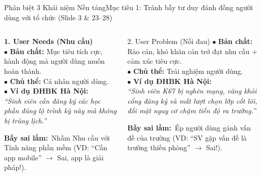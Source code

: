 \documentclass[aspectratio=169, 10pt]{beamer}
\begin{document}
\begin{frame}[t]{Phân biệt 3 Khái niệm Nền tảng}{Mục tiêu 1: Tránh bẫy tư duy đánh đồng người dùng với tổ chức (Slide 3 \& 23--28)}
  \vspace{-0.15cm}
  \begin{columns}[T]
      \begin{neutralBox}
        \scriptsize
        \textbf{\color{PrimaryBlue}1. User Needs (Nhu cầu)}\\[0.06cm]
        $\bullet$ \textbf{Bản chất:} Mục tiêu tích cực, hành động mà người dùng muốn hoàn thành.\\
        $\bullet$ \textbf{Chủ thể:} Cá nhân người dùng.\\
        $\bullet$ \textbf{Ví dụ ĐHBK Hà Nội:}\\\textit{``Sinh viên cần đăng ký các học phần đúng lộ trình kỳ này mà không bị trùng lịch.''}\\[0.1cm]
        \begin{tcolorbox}[colback=red!5!white, colframe=HustRed!50, arc=1mm, boxrule=0.4pt, left=1mm, right=1mm, top=1mm, bottom=1mm]
          \tiny\textbf{Bẫy sai lầm:}\ Nhầm Nhu cầu với Tính năng phần mềm (VD: ``Cần app mobile'' $\to$ Sai, app là giải pháp!).
        \end{tcolorbox}
      \end{neutralBox}

      \begin{alertCard}{2. User Problem (Nỗi đau)}
        \scriptsize
        $\bullet$ \textbf{Bản chất:} Rào cản, khó khăn cản trở đạt nhu cầu + cảm xúc tiêu cực.\\
        $\bullet$ \textbf{Chủ thể:} Trải nghiệm người dùng.\\
        $\bullet$ \textbf{Ví dụ ĐHBK Hà Nội:}\\\textit{``Sinh viên K67 bị nghẽn mạng, văng khỏi cổng đăng ký và mất lượt chọn lớp cốt lõi, đối mặt nguy cơ chậm tiến độ ra trường.''}\\[0.05cm]
        \begin{tcolorbox}[colback=white, colframe=HustRed!50, arc=1mm, boxrule=0.4pt, left=1mm, right=1mm, top=1mm, bottom=1mm]
          \tiny\textbf{Bẫy sai lầm:}\ Ép người dùng gánh vấn đề của trường (VD: ``SV gặp vấn đề là trường thiếu phòng'' $\to$ Sai!).
        \end{tcolorbox}
      \end{alertCard}


\end{columns}
\end{frame}
\end{document}
